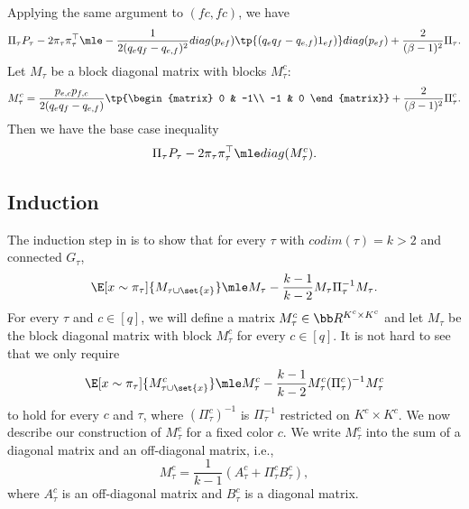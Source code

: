 Applying the same argument to $(fc, fc)$, we have
\begin{align*}
    \Pi_\tau P_\tau- 2\pi_\tau\pi_\tau^\top 
    \mle
    -\frac{1}{2(q_eq_f-q_{e,f})^2}\-{diag}(\*p_{ef})\tp{(q_eq_f-q_{e,f})\*1_{ef})} \-{diag}(\*p_{ef})
    +
    \frac{2}{(\beta-1)^2}\Pi_\tau.
\end{align*}
Let $M_\tau$ be a block diagonal matrix with blocks $M_\tau^c$:
\begin{equation}\label{eqn:base-case-def-ol}
    M_\tau^c=\frac{p_{e,c}p_{f,c}}{2(q_e q_f-q_{e,f})}\tp{\begin{matrix}
    0 & -1\\
    -1 & 0
\end{matrix}}
+
\frac{2}{(\beta-1)^2}\Pi^c_\tau.
\end{equation}
Then we have the base case inequality
\begin{align*}
    \Pi_\tau P_\tau- 2\pi_\tau\pi_\tau^\top \mle \-{diag}(M_\tau^c).
\end{align*}

\subsection{Induction}
The induction step in  is to show that for every $\tau$ with $\!{codim}(\tau) = k>2$ and connected $G_\tau$,
\begin{equation}\label{eqn:induction-main}
	\E[x\sim\pi_\tau]{M_{\tau\cup \set{x}}}\mle M_\tau - \frac{k-1}{k-2}M_\tau \Pi_\tau^{-1} M_\tau.
\end{equation}
For every $\tau$ and $c\in [q]$, we will define a matrix $M_\tau^c \in \bb R^{K^c\times K^c}$ and let $M_\tau$ be the block diagonal matrix with block $M_\tau^c$ for every $c\in [q]$. 
It is not hard to see that we only require 
\begin{equation}\label{eqn:induction-main-c}
	\E[x\sim\pi_\tau]{M_{\tau\cup \set{x}}^c}\mle M_\tau^c - \frac{k-1}{k-2}M_\tau^c (\Pi_\tau^c)^{-1} M_\tau^c
\end{equation}
to hold for every $c$ and $\tau$, where $(\Pi_\tau^c)^{-1}$ is $\Pi_\tau^{-1}$ restricted on $K^c\times K^c$.
We now describe our construction of $M^c_\tau$ for a fixed color $c$.
We write $M_\tau^c$ into the sum of a diagonal matrix and an off-diagonal matrix, i.e.,
\begin{equation}\label{eqn:N-decompose}
	M_\tau^c = \frac{1}{k-1}(A_\tau^c+\Pi_\tau^c B_\tau^c),
\end{equation}
where $A_\tau^c$ is an off-diagonal matrix and $B_\tau^c$ is a diagonal matrix.

